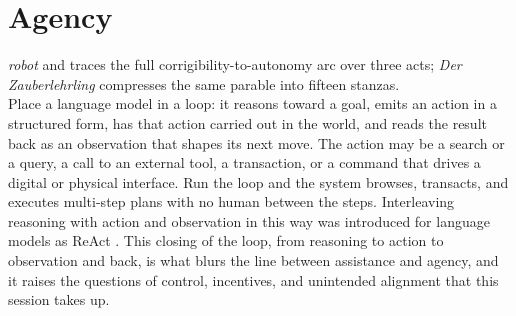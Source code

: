 \chapter{Agency}




 \textit{robot} and traces the full
corrigibility-to-autonomy arc over three acts; \textit{Der Zauberlehrling} compresses the same parable
into fifteen stanzas.\\

 Place a
language model in a loop: it reasons toward a goal, emits an action in a
structured form, has that action carried out in the world, and reads the
result back as an observation that shapes its next move.
The action may be a search or a query, a call to an external tool, a
transaction, or a command that drives a digital or physical interface. Run
the loop and the system browses, transacts, and executes multi-step plans
with no human between the steps. Interleaving reasoning with action and
observation in this way was introduced for language models as ReAct
\cite{yao2022react}. This closing of the loop, from reasoning to
action to observation and back, is what blurs the line between assistance and
agency, and it raises the questions of control, incentives, and unintended
alignment that this session takes up.

